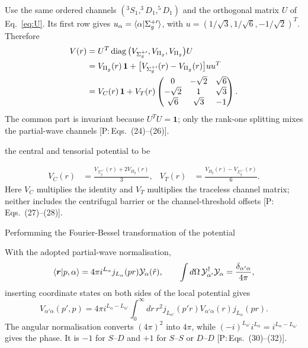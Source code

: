 \documentclass[11pt,a4paper]{article}
\newcommand{\tagP}[1]{\textcolor{blue!65!black}{\textsf{\small[P:\,#1]}}}
\newenvironment{aiadd}{\par}{\par}
\begin{document}
\begin{aiadd}
	Use the same ordered channels $(^3S_1,^3D_1,^5D_1)$ and the orthogonal
	matrix $U$ of Eq.~\eqref{eq:U}. Its first row gives
	$u_\alpha=\braket{\alpha|\Sigma_g^{+\prime}}$, with
	$u=(1/\sqrt3,1/\sqrt6,-1/\sqrt2)^T$. Therefore
	\begin{align}
		V(r)
		&=U^T\operatorname{diag}
		\big(V_{\Sigma_g^{+\prime}},V_{\Pi_g},V_{\Pi_g}\big)U
		\notag\\
		&=V_{\Pi_g}(r)\,\bm 1+
		\big[V_{\Sigma_g^{+\prime}}(r)-V_{\Pi_g}(r)\big]uu^T
		\notag\\
		&=V_C(r)\,\bm 1+V_T(r)
		\begin{pmatrix}
			0&-\sqrt2&\sqrt6\\
			-\sqrt2&1&\sqrt3\\
			\sqrt6&\sqrt3&-1
		\end{pmatrix}.
		\label{eq:pc-bo-matrix}
	\end{align}
	The common part is invariant because $U^TU=\bm 1$; only the rank-one
	splitting mixes the partial-wave channels \tagP{Eqs.~(24)--(26)}.
\end{aiadd}

the central and tensorial potential to be
\begin{aiadd}
	\begin{align}
		V_C(r)&=\frac{V_{\Sigma_g^{+\prime}}(r)+2V_{\Pi_g}(r)}{3},
		&
		V_T(r)&=\frac{V_{\Pi_g}(r)-V_{\Sigma_g^{+\prime}}(r)}{6}.
		\label{eq:pc-central-tensor}
	\end{align}
	Here $V_C$ multiplies the identity and $V_T$ multiplies the traceless
	channel matrix; neither includes the centrifugal barrier or the
	channel-threshold offsets \tagP{Eqs.~(27)--(28)}.
\end{aiadd}


Performming the Fourier-Bessel transformation of the potential
\begin{aiadd}
	With the adopted partial-wave normalisation,
	\[
		\braket{\bm r|p,\alpha}
		=4\pi i^{L_\alpha}j_{L_\alpha}(pr)\mathcal Y_\alpha(\hat r),
		\qquad
		\int d\Omega\,\mathcal Y_{\alpha'}^\dagger\mathcal Y_\alpha
		=\frac{\delta_{\alpha'\alpha}}{4\pi},
	\]
	inserting coordinate states on both sides of the local potential gives
	\begin{equation}
		V_{\alpha'\alpha}(p',p)
		=4\pi i^{L_\alpha-L_{\alpha'}}
		\int_0^\infty dr\,r^2
		j_{L_{\alpha'}}(p'r)V_{\alpha'\alpha}(r)j_{L_\alpha}(pr).
		\label{eq:pc-fourier-bessel}
	\end{equation}
	The angular normalisation converts $(4\pi)^2$ into $4\pi$, while
	$(-i)^{L_{\alpha'}}i^{L_\alpha}=i^{L_\alpha-L_{\alpha'}}$ gives the
	phase. It is $-1$ for $S$--$D$ and $+1$ for $S$--$S$ or $D$--$D$
	\tagP{Eqs.~(30)--(32)}.
\end{aiadd}
\end{document}
